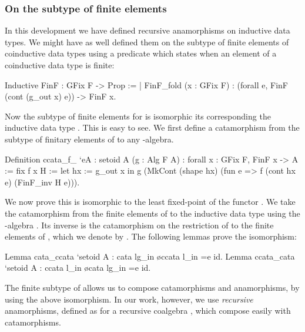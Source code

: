 \documentclass[ a4paper, UKenglish, cleveref, autoref, thm-restate]{lipics-v2021}
\begin{document}
\subsubsection{On the subtype of finite elements}
In this development we have defined recursive anamorphisms on inductive data
types.  We might have as well defined them on the subtype of finite elements of
coinductive data types using a predicate which states when an element of a
coinductive data type is finite:
\begin{coqcode}
Inductive FinF : GFix F -> Prop :=
| FinF_fold (x : GFix F) : (forall e, FinF (cont (g_out x) e)) -> FinF x.
\end{coqcode}
Now the subtype  of finite elements for 
is isomorphic its corresponding the inductive data type . This is
easy to see. We first define a catamorphism  from the
subtype  of finitary elements of  to
any -algebra.
\begin{coqcode}
Definition ccata_f_ `{eA : setoid A} (g : Alg F A)
  : forall x : GFix F, FinF x -> A := fix f x H :=
    let hx := g_out x in
      g (MkCont (shape hx) (fun e => f (cont hx e) (FinF_inv H e))).
\end{coqcode}
We now prove this is isomorphic to the least fixed-point of the functor
.
We take the catamorphism from the finite elements of  to the
inductive data type  using the -algebra . Its
inverse is the catamorphism on the restriction of  to the finite
elements of , which we denote by .  The following lemmas
prove the isomorphism:
\begin{coqcode}
Lemma cata_ccata `{setoid A} : cata lg_in \o ccata l_in =e id.
Lemma ccata_cata `{setoid A} : ccata l_in \o cata lg_in =e id.
\end{coqcode}
The finite subtype of  allows us to compose
catamorphisms and anamorphisms, by using the above isomorphism. In our work,
however, we use \emph{recursive} anamorphisms, defined as  for
a recursive coalgebra , which compose easily with
catamorphisms.
\end{document}
